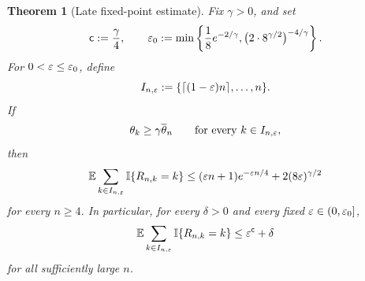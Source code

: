 \documentclass[10pt]{article}
\newtheorem{thm}{Theorem}[section]
\numberwithin{equation}{section}
\begin{document}
\begin{thm}[Late fixed-point estimate]\label{thm:end-fixedpoint}
    Fix $\gamma>0$, and set
    \begin{equation}\label{eq:late-constants}
        \mathsf c:=\frac{\gamma}{4},
        \qquad
        \varepsilon_0:=\min\left\{
            \frac18e^{-2/\gamma},
            \bigl(2\cdot8^{\gamma/2}\bigr)^{-4/\gamma}
        \right\}.
    \end{equation}
    For $0<\varepsilon\leq\varepsilon_0$, define
    \[
        I_{n,\varepsilon}:=\{\lceil(1-\varepsilon)n\rceil,\ldots,n\}.
    \]
    If
    \begin{equation}\label{eq:terminal-lower-bound}
        \theta_k\geq\gamma\overline\theta_n
        \qquad\text{for every }k\in I_{n,\varepsilon},
    \end{equation}
    then
    \begin{equation}\label{eq:explicit-late-bound}
        \mathbb E\sum_{k\in I_{n,\varepsilon}}\mathbb I\{R_{n,k}=k\}
        \leq (\varepsilon n+1)e^{-\varepsilon n/4}+2(8\varepsilon)^{\gamma/2}
    \end{equation}
    for every $n\geq4$.  In particular, for every $\delta>0$ and every fixed
    $\varepsilon\in(0,\varepsilon_0]$,
    \begin{equation}\label{eq:late-bound-delta}
        \mathbb E\sum_{k\in I_{n,\varepsilon}}\mathbb I\{R_{n,k}=k\}
        \leq \varepsilon^{\mathsf c}+\delta
    \end{equation}
    for all sufficiently large $n$.
\end{thm}
\end{document}
